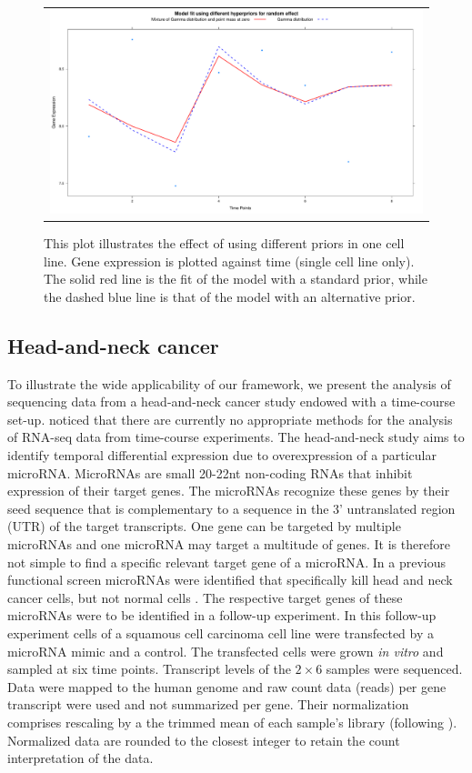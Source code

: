 \begin{figure}[h!]
\centering
\begin{tabular}{c}
\includegraphics[scale=0.4]{Figure7.pdf}
\end{tabular}
\caption{This plot illustrates the effect of using different priors in one cell line.
 Gene expression is plotted against time (single cell line only). The
 solid red line is the fit of the model with a standard prior, while the dashed
 blue line is that of the model with an alternative prior.}
\label{fig:priors}
\end{figure}

\subsection{Head-and-neck cancer}
\label{headNeck}
To illustrate the wide applicability of our framework, we present the analysis of sequencing data from a head-and-neck cancer study endowed with a time-course set-up. \cite{Oshlack2010} noticed that there are currently no appropriate methods for the analysis of RNA-seq data from time-course experiments. The head-and-neck study aims to identify temporal differential expression due to overexpression of a particular microRNA. MicroRNAs are small 20-22nt non-coding RNAs that inhibit expression of their target genes. The microRNAs recognize these genes by their seed sequence that is complementary to a sequence in the 3' untranslated region (UTR) of the target transcripts. One gene can be targeted by multiple microRNAs and one microRNA may target a multitude of genes. It is therefore not simple to find a specific relevant target gene of a microRNA. In a previous functional screen microRNAs were identified that specifically kill head and neck cancer cells, but not normal cells \cite{Lindenbergh2013}. The respective target genes of these microRNAs were to be identified in a follow-up experiment. In this follow-up experiment cells of a squamous cell carcinoma cell line were transfected by a microRNA mimic and a control. The transfected cells were grown {\it in vitro} and sampled at six time points. Transcript levels of the $2 \times 6$ samples were sequenced. Data were mapped to the human genome and raw count data (reads) per gene transcript were used and not summarized per gene. Their normalization comprises rescaling by a the trimmed mean of each sample's library (following \cite{Oshlack2010}). Normalized data are rounded to the closest integer to retain the count interpretation of the data.


